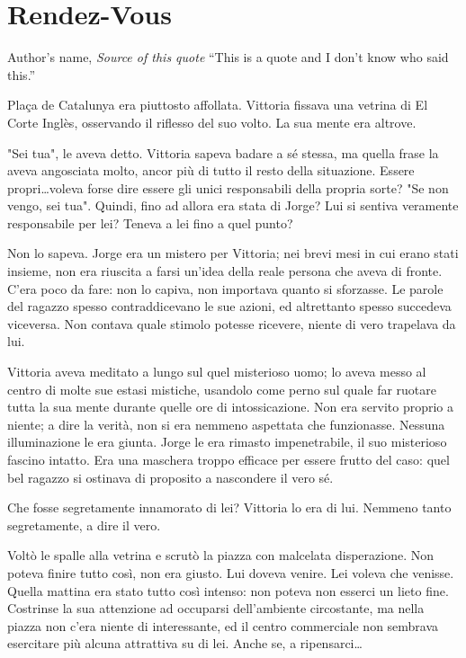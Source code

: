 \chapter{Rendez-Vous}

\begin{chapquote}{Author's name, \textit{Source of this quote}}
``This is a quote and I don't know who said this.''
\end{chapquote}


Plaça de Catalunya era piuttosto affollata. Vittoria fissava una vetrina di El Corte Inglès, osservando il riflesso del suo volto. La sua mente era altrove.

"Sei tua", le aveva detto. Vittoria sapeva badare a sé stessa, ma quella frase la aveva angosciata molto, ancor più di tutto il resto della situazione. Essere propri\ldots voleva forse dire essere gli unici responsabili della propria sorte? "Se non vengo, sei tua". Quindi, fino ad allora era stata di Jorge? Lui si sentiva veramente responsabile per lei? Teneva a lei fino a quel punto?

Non lo sapeva. Jorge era un mistero per Vittoria; nei brevi mesi in cui erano stati insieme, non era riuscita a farsi un'idea della reale persona che aveva di fronte. C'era poco da fare: non lo capiva, non importava quanto si sforzasse. Le parole del ragazzo spesso contraddicevano le sue azioni, ed altrettanto spesso succedeva viceversa. Non contava quale stimolo potesse ricevere, niente di vero trapelava da lui.

Vittoria aveva meditato a lungo sul quel misterioso uomo; lo aveva messo al centro di molte sue estasi mistiche, usandolo come perno sul quale far ruotare tutta la sua mente durante quelle ore di intossicazione. Non era servito proprio a niente; a dire la verità, non si era nemmeno aspettata che funzionasse. Nessuna illuminazione le era giunta. Jorge le era rimasto impenetrabile, il suo misterioso fascino intatto. Era una maschera troppo efficace per essere frutto del caso: quel bel ragazzo si ostinava di proposito a nascondere il vero sé.

Che fosse segretamente innamorato di lei? Vittoria lo era di lui. Nemmeno tanto segretamente, a dire il vero.

Voltò le spalle alla vetrina e scrutò la piazza con malcelata disperazione. Non poteva finire tutto così, non era giusto. Lui doveva venire. Lei voleva che venisse. Quella mattina era stato tutto così intenso: non poteva non esserci un lieto fine. Costrinse la sua attenzione ad occuparsi dell'ambiente circostante, ma nella piazza non c'era niente di interessante, ed il centro commerciale non sembrava esercitare più alcuna attrattiva su di lei. Anche se, a ripensarci\ldots

